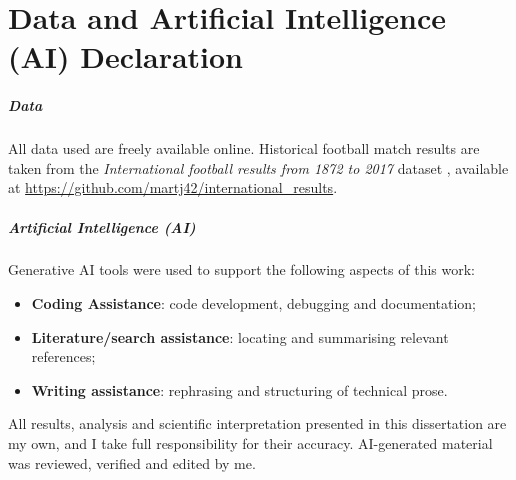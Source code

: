 \chapter*{Data and Artificial Intelligence (AI) Declaration}

\paragraph{Data}
All data used are freely available online. Historical football match results are taken from the \emph{International football results from 1872 to 2017} dataset \cite{martj42_international_results}, available at \url{https://github.com/martj42/international_results}.

\paragraph{Artificial Intelligence (AI)} 

Generative AI tools were used to support the following aspects of this work:

\begin{itemize}
    \item \textbf{Coding Assistance}: code development, debugging and documentation;
    \item \textbf{Literature/search assistance}: locating and summarising relevant references;
    \item \textbf{Writing assistance}: rephrasing and structuring of technical prose.
\end{itemize}

All results, analysis and scientific interpretation presented in this dissertation are my own, and I take full responsibility for their accuracy. AI-generated material was reviewed, verified and edited by me.
